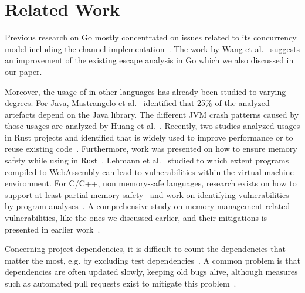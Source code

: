 \section{Related Work}
\label{sec:rw}

Previous research on Go mostly concentrated on issues related to its concurrency model including the channel implementation~\cite{tu2019,dilley2019,giunti2020,gabet2020,lange2017,bodden2016information}.
The work by Wang et al.~\cite{wang2020} suggests an improvement of the existing escape analysis in Go which we also discussed in our paper. 


Moreover, the usage of \unsafe{} in other languages has already been studied to varying degrees. 
For Java, Mastrangelo et al.~\cite{mastrangelo2015} identified that 25\% of the analyzed artefacts depend on the Java \unsafe{} library.
The different JVM crash patterns caused by those usages are analyzed by Huang et al.~\cite{huang2019}.
Recently, two studies analyzed \unsafe{} usages in Rust projects and identified that \unsafe{} is widely used to improve performance or to reuse existing code~\cite{qin2020,evans2020}.
Furthermore, work was presented on how to ensure memory safety while using \unsafe{} in Rust~\cite{hussain2018Fidelius}.
Lehmann et al.~\cite{lehmann-everything-2020} studied to which extent \unsafe{} programs compiled to WebAssembly can lead to vulnerabilities within the virtual machine environment. %
%
%
For C/C++, non memory-safe languages, research exists on how to support at least partial memory safety~\cite{burow2018CUP, nagarkatte2009SoftBound} and work on identifying vulnerabilities by program analyses~\cite{song2019sok}.
A comprehensive study on memory management related vulnerabilities, like the ones we discussed earlier, and their mitigations is presented in earlier work~\cite{szekeres2013sok}.

Concerning project dependencies, it is difficult to count the dependencies that matter the most, e.g. by excluding test dependencies~\cite{pashchenko2018}.
A common problem is that dependencies are often updated slowly, keeping old bugs alive, although measures such as automated pull requests exist to mitigate this problem~\cite{derr2017keep, mirhosseini2017, lauinger2017}.


